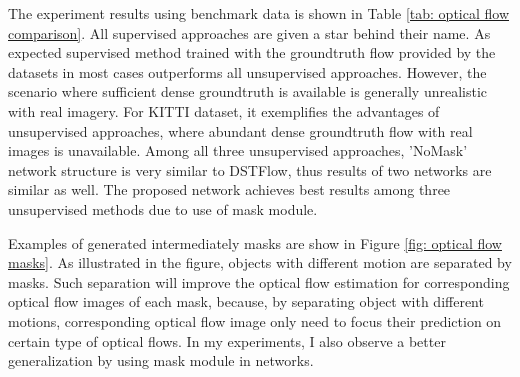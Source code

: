 \documentclass{iitthesis}
\begin{document}
The experiment results using benchmark data is shown in Table \ref{tab: optical flow comparison}. All supervised approaches are given a star behind their name. As expected supervised method trained with the groundtruth flow provided by the datasets in most cases outperforms all unsupervised approaches. However, the scenario where sufficient dense groundtruth is available is generally unrealistic with real imagery. For KITTI dataset, it exemplifies the advantages of unsupervised approaches, where abundant dense groundtruth flow with real images is unavailable. Among all three unsupervised approaches, 'NoMask' network structure is very similar to DSTFlow, thus results of two networks are similar as well. The proposed network achieves best results among three unsupervised methods due to use of mask module. 



Examples of generated intermediately masks are show in Figure \ref{fig: optical flow masks}. As illustrated in the figure, objects with different motion are separated by masks. Such separation will improve the optical flow estimation for corresponding optical flow images of each mask, because, by separating object with different motions, corresponding optical flow image only need to focus their prediction on certain type of optical flows. In my experiments, I also observe a better generalization by using mask module in networks.
\end{document}
